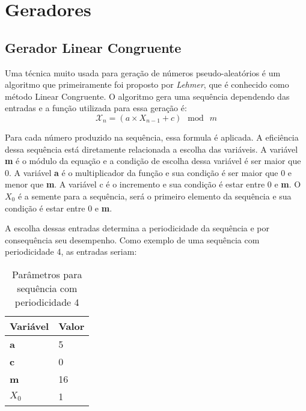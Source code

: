 

\section{Geradores}
\subsection{Gerador Linear Congruente}

Uma técnica muito usada para geração de números pseudo-aleatórios é um algoritmo que primeiramente foi proposto por \textit{Lehmer}, que é conhecido como método Linear Congruente. \cite{william-stallings} O algoritmo gera uma sequência dependendo das entradas e a função utilizada para essa geração é:
\begin{equation}
	\label{Função para geração de números aleatórios.}
	\mathcal{X}_n = (a \times X_{n - 1} + c)\: \bmod \: m	
\end{equation}

Para cada número produzido na sequência, essa formula é aplicada. A eficiência dessa sequência está diretamente relacionada a escolha das variáveis. A variável \textbf{m} é o módulo da equação e a condição de escolha dessa variável é ser maior que 0. A variável \textbf{a} é o multiplicador da função e sua condição é ser maior que 0 e menor que \textbf{m}. A variável c é o incremento e sua condição é estar entre 0 e \textbf{m}. O \textbf{$X_0$} é a semente para a sequência, será o primeiro elemento da sequência e sua condição é estar entre 0 e \textbf{m}.

A escolha dessas entradas determina a periodicidade da sequência e por consequência seu desempenho. Como exemplo de uma sequência com periodicidade 4, as entradas seriam:

\begin{table}[h]
	\centering
	\begin{tabular}{|l|l|}	
	\hline
		Variável & Valor \\ \hline
		\textbf{a} & 5 \\ \hline
		\textbf{c} & 0 \\ \hline
		\textbf{m} & 16 \\ \hline
		\textbf{$X_0$} & 1 \\ \hline
	\end{tabular}
	\caption{Parâmetros para sequência com periodicidade 4}
\end{table}

